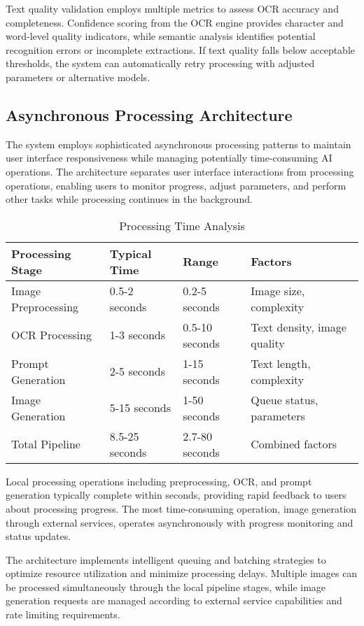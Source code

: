 Text quality validation employs multiple metrics to assess OCR accuracy and completeness. Confidence scoring from the OCR engine provides character and word-level quality indicators, while semantic analysis identifies potential recognition errors or incomplete extractions. If text quality falls below acceptable thresholds, the system can automatically retry processing with adjusted parameters or alternative models.

\subsection{Asynchronous Processing Architecture}

The system employs sophisticated asynchronous processing patterns to maintain user interface responsiveness while managing potentially time-consuming AI operations. The architecture separates user interface interactions from processing operations, enabling users to monitor progress, adjust parameters, and perform other tasks while processing continues in the background.

\begin{table}[H]
\centering
\caption{Processing Time Analysis}
\label{tab:processing_times}
\begin{tabular}{|l|l|l|l|}
\hline
\textbf{Processing Stage} & \textbf{Typical Time} & \textbf{Range} & \textbf{Factors} \\
\hline
Image Preprocessing & 0.5-2 seconds & 0.2-5 seconds & Image size, complexity \\
\hline
OCR Processing & 1-3 seconds & 0.5-10 seconds & Text density, image quality \\
\hline
Prompt Generation & 2-5 seconds & 1-15 seconds & Text length, complexity \\
\hline
Image Generation & 5-15 seconds & 1-50 seconds & Queue status, parameters \\
\hline
Total Pipeline & 8.5-25 seconds & 2.7-80 seconds & Combined factors \\
\hline
\end{tabular}
\end{table}

Local processing operations including preprocessing, OCR, and prompt generation typically complete within seconds, providing rapid feedback to users about processing progress. The most time-consuming operation, image generation through external services, operates asynchronously with progress monitoring and status updates.

The architecture implements intelligent queuing and batching strategies to optimize resource utilization and minimize processing delays. Multiple images can be processed simultaneously through the local pipeline stages, while image generation requests are managed according to external service capabilities and rate limiting requirements.

